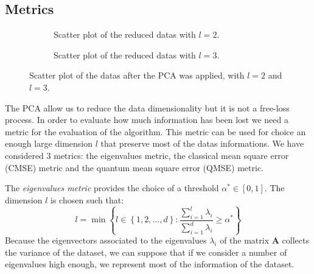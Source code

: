 \documentclass[%
    twoside, 
    a4paper
    ]{article}
\newcommand{\imagesPath}{./Images}
\begin{document}
    \subsection{Metrics}
        \begin{figure}[t]
            \centering
            \begin{subfigure}[t]{0.49\linewidth}
                
                \caption{Scatter plot of the reduced datas with $l=2$.}
                \label{fig:l2PCA}
            \end{subfigure}
            \hfill
            \begin{subfigure}[t]{0.49\linewidth}
                
                \caption{Scatter plot of the reduced datas with $l=3$.}
                \label{fig:l3PCA}
            \end{subfigure}
            \caption{Scatter plot of the datas after the PCA was applied, with $l=2$ and $l=3$.}
        \end{figure}
        The PCA allow us to reduce the data dimensionality but it is not a free-loss 
        process. In order to evaluate how much information has been lost we need a 
        metric for the evaluation of the algorithm. This metric can 
        be used for choice an enough large dimension $l$ that preserve most of the
        datas informations.
        We have considered 3 metrics: the eigenvalues metric, the classical mean square
        error (CMSE) metric and the quantum mean square error (QMSE) metric.

        The \emph{eigenvalues metric} provides the choice of a threshold $\alpha^* \in 
        \left[ 0, 1 \right]$.
        The dimension $l$ is chosen such that:
        \begin{equation}
            \label{eq:eigenvaluesMetric}
            l = \min \left\{ l \in \left\{ 1,2,\dots,d \right\}: 
            \frac{\sum_{i=1}^l \lambda_i}{\sum_{i=1}^d \lambda_i} \geq \alpha^* \right\}
        \end{equation}
        Because the eigenvectors associated to the eigenvalues $\lambda_i$ of the matrix 
        $\bm{A}$ collects the variance of the dataset, we can suppose that if we consider 
        a number of eigenvalues high enough, we represent most of the information of the 
        dataset.
\end{document}
